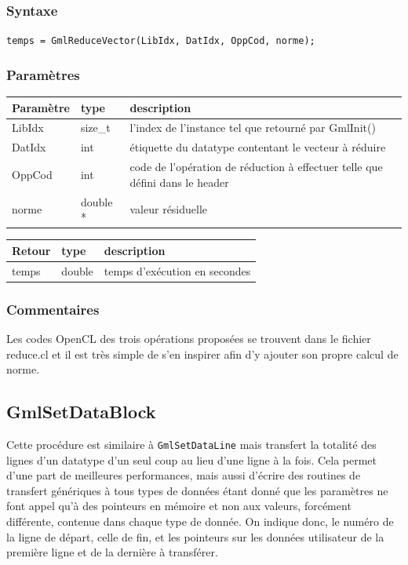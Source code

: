\documentclass[a4paper,12pt]{article}
\begin{document}
\subsubsection*{Syntaxe}

{\tt temps = GmlReduceVector(LibIdx, DatIdx, OppCod, norme);}

\subsubsection*{Paramètres}

\begin{tabular}{|m{2cm}|m{1.5cm}|m{10.5cm}|}
\hline
Paramètre  & type     & description \\
\hline
LibIdx     & size\_t  & l'index de l'instance tel que retourné par GmlInit() \\
\hline
DatIdx     & int      & étiquette du datatype contentant le vecteur à réduire  \\
\hline
OppCod     & int      & code de l'opération de réduction à effectuer telle que défini dans le header \\
\hline
norme      & double * & valeur résiduelle \\
\hline
\end{tabular}

\medskip

\begin{tabular}{|m{2cm}|m{1.5cm}|m{10.5cm}|}
\hline
Retour     & type   & description \\
\hline
temps      & double & temps d'exécution en secondes \\
\hline
\end{tabular}

\subsubsection*{Commentaires}
Les codes OpenCL des trois opérations proposées se trouvent dans le fichier reduce.cl et il est très simple de s'en inspirer afin d'y ajouter son propre calcul de norme.


\subsection{GmlSetDataBlock}

Cette procédure est similaire à {\tt GmlSetDataLine} mais transfert la totalité des lignes d'un datatype d'un seul coup au lieu d'une ligne à la fois. Cela permet d'une part de meilleures performances, mais aussi d'écrire des routines de transfert génériques à tous types de données étant donné que les paramètres ne font appel qu'à des pointeurs en mémoire et non aux valeurs, forcément différente, contenue dans chaque type de donnée.
On indique donc, le numéro de la ligne de départ, celle de fin, et les pointeurs sur les données utilisateur de la première ligne et de la dernière à transférer.
\end{document}
